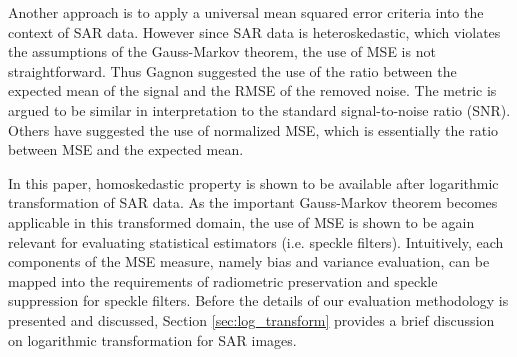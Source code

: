 
Another approach is to apply a universal mean squared error criteria into the context of SAR data. 
However since SAR data is heteroskedastic, which violates the assumptions of the Gauss-Markov theorem, 
	the use of MSE is not straightforward. 
Thus Gagnon \cite{Gagnon_SPIEProc_1997} suggested the use of
  the ratio between the expected mean of the signal and the RMSE of the removed noise. 
The metric is argued to be similar in interpretation to the standard signal-to-noise ratio (SNR). 
Others have suggested the use of normalized MSE, which is essentially the ratio between MSE and the expected mean.


In this paper, homoskedastic property is shown to be available after logarithmic transformation of SAR data.
As the important Gauss-Markov theorem becomes applicable in this transformed domain, 
	the use of MSE is shown to be again relevant for evaluating statistical estimators (i.e. speckle filters).
Intuitively, each components of the MSE measure, 
	namely bias and variance evaluation, can be mapped into 
	the requirements of radiometric preservation and speckle suppression for speckle filters.
Before the details of our evaluation methodology is presented and discussed, 
	Section \ref{sec:log_transform} provides a brief discussion on logarithmic transformation for SAR images.


